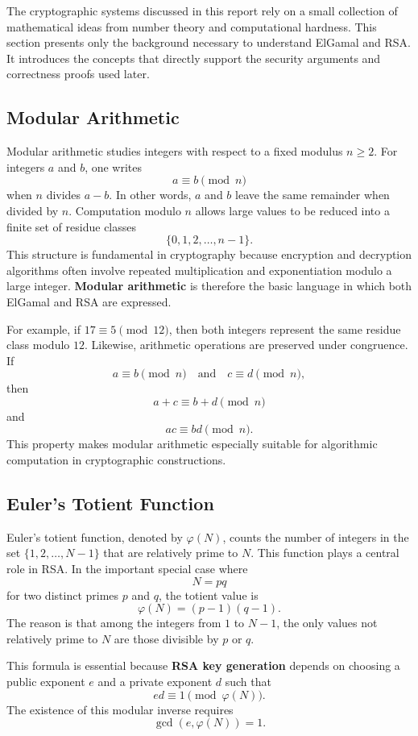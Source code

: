 The cryptographic systems discussed in this report rely on a small collection of mathematical ideas from number theory and computational hardness. This section presents only the background necessary to understand ElGamal and RSA. It introduces the concepts that directly support the security arguments and correctness proofs used later.

\subsection{Modular Arithmetic}

Modular arithmetic studies integers with respect to a fixed modulus $n \geq 2$. For integers $a$ and $b$, one writes
\[
a \equiv b \pmod{n}
\]
when $n$ divides $a-b$. In other words, $a$ and $b$ leave the same remainder when divided by $n$. Computation modulo $n$ allows large values to be reduced into a finite set of residue classes
\[
\{0,1,2,\dots,n-1\}.
\]
This structure is fundamental in cryptography because encryption and decryption algorithms often involve repeated multiplication and exponentiation modulo a large integer. \textbf{Modular arithmetic} is therefore the basic language in which both ElGamal and RSA are expressed.

For example, if $17 \equiv 5 \pmod{12}$, then both integers represent the same residue class modulo $12$. Likewise, arithmetic operations are preserved under congruence. If
\[
a \equiv b \pmod{n}
\quad \text{and} \quad
c \equiv d \pmod{n},
\]
then
\[
a+c \equiv b+d \pmod{n}
\]
and
\[
ac \equiv bd \pmod{n}.
\]
This property makes modular arithmetic especially suitable for algorithmic computation in cryptographic constructions.

\subsection{Euler's Totient Function}

Euler's totient function, denoted by $\varphi(N)$, counts the number of integers in the set $\{1,2,\dots,N-1\}$ that are relatively prime to $N$. This function plays a central role in RSA. In the important special case where
\[
N = pq
\]
for two distinct primes $p$ and $q$, the totient value is
\[
\varphi(N) = (p-1)(q-1).
\]
The reason is that among the integers from $1$ to $N-1$, the only values not relatively prime to $N$ are those divisible by $p$ or $q$.

This formula is essential because \textbf{RSA key generation} depends on choosing a public exponent $e$ and a private exponent $d$ such that
\[
ed \equiv 1 \pmod{\varphi(N)}.
\]
The existence of this modular inverse requires
\[
\gcd(e,\varphi(N)) = 1.
\]

